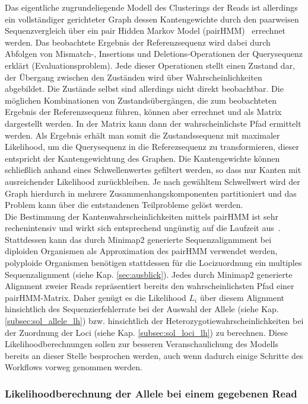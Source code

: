 Das eigentliche zugrundeliegende Modell des Clusterings der Reads ist allerdings ein vollständiger gerichteter Graph dessen Kantengewichte durch den paarweisen Sequenzvergleich über ein pair Hidden Markov Model (pairHMM)~\cite{durbin_1998} errechnet werden. Das beobachtete Ergebnis der Referenzsequenz wird dabei durch Abfolgen von Mismatch-, Insertions und Deletions-Operationen der Querysequenz erklärt (Evaluationsproblem). Jede dieser Operationen stellt einen Zustand dar, der Übergang zwischen den Zuständen wird über Wahrscheinlichkeiten abgebildet. Die Zustände selbst sind allerdings nicht direkt beobachtbar. Die möglichen Kombinationen von Zustandsübergängen, die zum beobachteten Ergebnis der Referenzsequenz führen, können aber errechnet und als Matrix dargestellt werden. In der Matrix kann dann der wahrscheinlichste Pfad ermittelt werden. Als Ergebnis erhält man somit die Zustandssequenz mit maximaler Likelihood, um die Querysequenz in die Referezsequenz zu transformieren, dieser entspricht der Kantengewichtung des Graphen. Die Kantengewichte können schließlich anhand eines Schwellenwertes gefiltert werden, so dass nur Kanten mit ausreichender Likelihood zurückbleiben. Je nach gewähltem Schwellwert wird der Graph hierdurch in mehrere Zusammenhangskomponenten partitioniert und das Problem kann über die entstandenen Teilprobleme gelöst werden. \\

Die Bestimmung der Kantenwahrscheinlichkeiten mittels pairHMM ist sehr rechenintensiv und wirkt sich entsprechend ungünstig auf die Laufzeit aus~\cite{durbin_1998, yoon_2009}. Stattdessen kann das durch Minimap2 generierte Sequenzalignmment bei diploiden Organismen als Approximation des pairHMM verwendet werden, polyploide Organismen benötigen stattdessen für die Locizuordnung ein multiples Sequenzalignment (siehe Kap. \ref{sec:ausblick}). Jedes durch Minimap2 generierte Alignment zweier Reads repräsentiert bereits den wahrscheinlichsten Pfad einer pairHMM-Matrix. Daher genügt es die Likelihood $ L_{i} $ über diesem Alignment hinsichtlich des Sequenzierfehlerrate bei der Auswahl der Allele (siehe Kap. \ref{subsec:sol_allele_lh}) bzw. hinsichtlich der Heterozygotiewahrscheinlichkeiten bei der Zuordnung der Loci (siehe Kap. \ref{subsec:sol_loci_lh}) zu berechnen. Diese Likelihoodberechnungen sollen zur besseren Veranschaulichung des Modells bereits an dieser Stelle besprochen werden, auch wenn dadurch einige Schritte des Workflows vorweg genommen werden.

\subsubsection{Likelihoodberechnung der Allele bei einem gegebenen Read} \label{pHMM_alleles}

